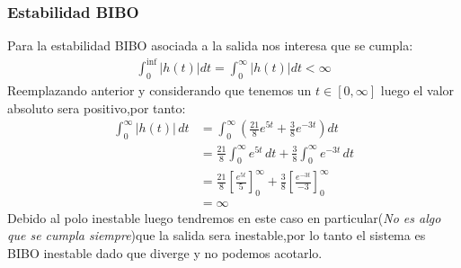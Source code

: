 \documentclass[
  11pt,
  letterpaper,
   addpoints,
   answers
  ]{exam}
\begin{document}
\begin{questions}
\begin{solution}
    \subsubsection*{Estabilidad BIBO}
    Para la estabilidad BIBO asociada a la salida nos interesa que se cumpla:
    \begin{align}
        \int_{0}^{\inf}|h(t)|dt= \int_{0}^{\infty} |h(t)| dt < \infty
    \end{align}
    Reemplazando anterior y considerando que tenemos un $t \in [0,\infty]$ luego el valor absoluto sera positivo,por tanto:
    \begin{align}
        \int_{0}^{\infty} |h(t)| \, dt &= \int_{0}^{\infty} \left( \frac{21}{8} e^{5t} + \frac{3}{8} e^{-3t} \right) dt \\
        &= \frac{21}{8} \int_{0}^{\infty} e^{5t} \, dt + \frac{3}{8} \int_{0}^{\infty} e^{-3t} \, dt \\
        &= \frac{21}{8} \left[ \frac{e^{5t}}{5} \right]_{0}^{\infty} + \frac{3}{8} \left[ \frac{e^{-3t}}{-3} \right]_{0}^{\infty} \\
        &= \infty
    \end{align}
    Debido al polo inestable luego tendremos en este caso en particular(\textit{No es algo que se cumpla siempre})que la salida sera inestable,por lo tanto el sistema es BIBO inestable dado que diverge y no podemos acotarlo.

\end{solution}
\end{questions}
\end{document}
